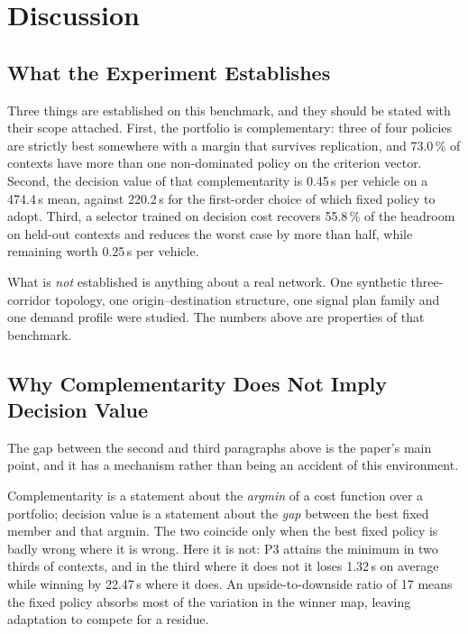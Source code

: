 
\section{Discussion}
\label{sec:discussion}

\subsection{What the Experiment Establishes}
\label{sec:disc:what}

Three things are established on this benchmark, and they should be stated with
their scope attached. First, the portfolio is complementary: three of four
policies are strictly best somewhere with a margin that survives replication, and
73.0\,\% of contexts have more than one non-dominated policy on the criterion
vector. Second, the decision value of that complementarity is 0.45\,s per vehicle
on a 474.4\,s mean, against 220.2\,s for the first-order choice of which fixed
policy to adopt. Third, a selector trained on decision cost recovers 55.8\,\% of
the headroom on held-out contexts and reduces the worst case by more than half,
while remaining worth 0.25\,s per vehicle.

What is \emph{not} established is anything about a real network. One synthetic
three-corridor topology, one origin--destination structure, one signal plan
family and one demand profile were studied. The numbers above are properties of
that benchmark.

\subsection{Why Complementarity Does Not Imply Decision Value}
\label{sec:disc:gap}

The gap between the second and third paragraphs above is the paper's main point,
and it has a mechanism rather than being an accident of this environment.

Complementarity is a statement about the \emph{argmin} of a cost function over a
portfolio; decision value is a statement about the \emph{gap} between the best
fixed member and that argmin. The two coincide only when the best fixed policy is
badly wrong where it is wrong. Here it is not: P3 attains the minimum in two
thirds of contexts, and in the third where it does not it loses 1.32\,s on average
while winning by 22.47\,s where it does. An upside-to-downside ratio of 17 means
the fixed policy absorbs most of the variation in the winner map, leaving
adaptation to compete for a residue.

